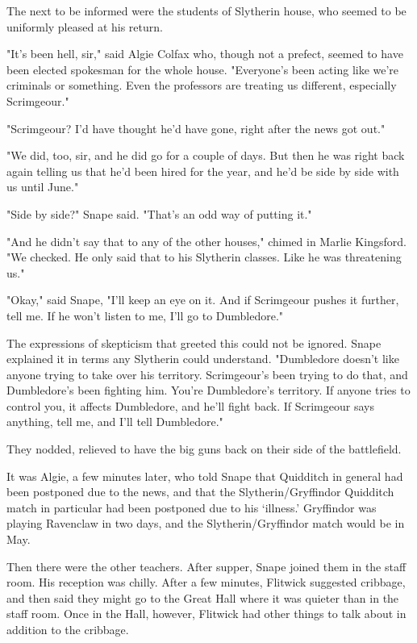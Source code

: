 The next to be informed were the students of Slytherin house, who seemed to be uniformly pleased at his return.

"It's been hell, sir," said Algie Colfax who, though not a prefect, seemed to have been elected spokesman for the whole house. "Everyone's been acting like we're criminals or something. Even the professors are treating us different, especially Scrimgeour."

"Scrimgeour? I'd have thought he'd have gone, right after the news got out."

"We did, too, sir, and he did go for a couple of days. But then he was right back again telling us that he'd been hired for the year, and he'd be side by side with us until June."

"Side by side?" Snape said. "That's an odd way of putting it."

"And he didn't say that to any of the other houses," chimed in Marlie Kingsford. "We checked. He only said that to his Slytherin classes. Like he was threatening us."

"Okay," said Snape, "I'll keep an eye on it. And if Scrimgeour pushes it further, tell me. If he won't listen to me, I'll go to Dumbledore."

The expressions of skepticism that greeted this could not be ignored. Snape explained it in terms any Slytherin could understand. "Dumbledore doesn't like anyone trying to take over his territory. Scrimgeour's been trying to do that, and Dumbledore's been fighting him. You're Dumbledore's territory. If anyone tries to control you, it affects Dumbledore, and he'll fight back. If Scrimgeour says anything, tell me, and I'll tell Dumbledore."

They nodded, relieved to have the big guns back on their side of the battlefield.

It was Algie, a few minutes later, who told Snape that Quidditch in general had been postponed due to the news, and that the Slytherin\slash Gryffindor Quidditch match in particular had been postponed due to his `illness.' Gryffindor was playing Ravenclaw in two days, and the Slytherin\slash Gryffindor match would be in May.

Then there were the other teachers. After supper, Snape joined them in the staff room. His reception was chilly. After a few minutes, Flitwick suggested cribbage, and then said they might go to the Great Hall where it was quieter than in the staff room. Once in the Hall, however, Flitwick had other things to talk about in addition to the cribbage.

